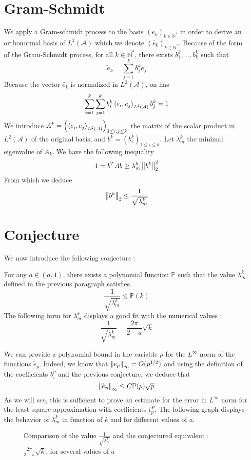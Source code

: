 \documentclass[11pt,a4paper]{article}
\begin{document}
\section{Gram-Schmidt}

We apply a Gram-schmidt process to the basis $(e_k)_{k \in \mathbb{N}^*}$ in order to derive an orthonormal basis of $L^2(\mathcal{A})$ which we denote $(\tilde{e_k})_{k \in \mathbb{N}^*}$. Because of the form of the Gram-Schmidt process, for all $k \in \mathbb{N}^*$, there exists $b_1^k, ..., b_k^k$ such that 
\[ \tilde{e}_{k} = \sum_{j=1}^k b_j^k e_j\]
Because the vector $\tilde{e_k}$ is normalized in $L^2(\mathcal{A})$, on has 
\[ \sum_{i=1}^k \sum_{j=1}^k b_i^k \left\langle e_i,e_j\right\rangle_{L^2(\mathcal{A})}b_j^k = 1\]
We introduce $A^k = \left(\left\langle e_i,e_j\right\rangle_{L^2(\mathcal{A})}\right)_{1\leq i,j\leq k}$ the matrix of the scalar product in $L^2(\mathcal{A})$ of the original basis, and $b^k = \left(b_i^k\right)_{1\leq i \leq k}$. Let $\lambda^k_{m}$ the minimal eigenvalue of $A_k$. We have the following inequality 
\[ 1 = b^T A b \geq \lambda_m^k \left\|b^k\right\|_{2}^2\]
From which we deduce \[\left\|b^k\right\|_{2} \leq \dfrac{1}{\sqrt{\lambda_m^k}}\]

\section{Conjecture}

We now introduce the following conjecture : 
\begin{Conj} For any $a \in (a,1)$, there exists a polynomial function $\mathbb{P}$ such that the value $\lambda_m^k$ defined in the previous paragraph satisfies 
\[\dfrac{1}{\sqrt{\lambda^k_m}} \leq \mathbb{P}(k)\]
The following form for $\lambda_m^k$ displays a good fit with the numerical values : 
\[ \dfrac{1}{\sqrt{\lambda_m^k}} = \dfrac{2\pi}{2-a}\sqrt{k}\]
\label{conj}
\end{Conj}
We can provide a polynomial bound in the variable $p$ for the $L^{\infty}$ norm of the functions $\tilde{e}_p$. Indeed, we know that $\left\|e_p\right\|_{\infty} = O(p^{1/2})$ and using the definition of the coefficients $b_i^p$ and the previous conjecture, we deduce that 
\[\left\|\tilde{e}_p\right\|_{\infty} \leq C \mathbb{P}(p)\sqrt{p} \]
As we will see, this is sufficient to prove an estimate for the error in $L^\infty$ norm for the least square approximation with coefficients $t^P_p$. 
The following graph displays the behavior of $\lambda_m^k$ in function of $k$ and for different values of $a$. 

\begin{figure}[h]
\centering

\subfigure[]{\label{fig:conj1}\scalebox{.5}{}}
\subfigure[]{\label{fig:conj1}\scalebox{.5}{}}
\subfigure[]{\label{fig:conj1}\scalebox{.5}{}}
\subfigure[]{\label{fig:conj1}\scalebox{.5}{}}
\caption{Comparison of the value $\frac{1}{\sqrt{\lambda_m^k}}$ and the conjectured equivalent : $\frac{2\pi}{2-a}\sqrt{k}$, for several values of $a$}
\label{compareApprox1}
\end{figure}
\end{document}

